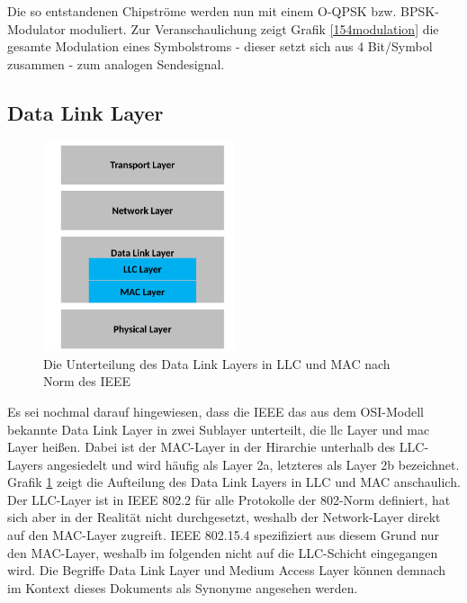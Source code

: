 Die so entstandenen Chipströme werden nun mit einem O-QPSK bzw. BPSK-Modulator moduliert. Zur Veranschaulichung zeigt Grafik \ref{154modulation} die gesamte Modulation eines Symbolstroms - dieser setzt sich aus 4 Bit/Symbol zusammen - zum analogen Sendesignal. \\

\subsection{Data Link Layer}
\begin{figure}
	\centering
	\includegraphics[width=0.5\textwidth]{Grafiken-Alex/ieee-osi.pdf}
	\caption{Die Unterteilung des Data Link Layers in LLC und MAC nach Norm des IEEE}
	\label{ieee-osi}
\end{figure}
Es sei nochmal darauf hingewiesen, dass die IEEE das aus dem OSI-Modell bekannte Data Link Layer in zwei Sublayer unterteilt, die \ac{llc} Layer und \acf{mac} Layer heißen. Dabei ist der MAC-Layer in der Hirarchie unterhalb des LLC-Layers angesiedelt und wird häufig als Layer 2a, letzteres als Layer 2b bezeichnet. Grafik \ref{ieee-osi} zeigt die Aufteilung des Data Link Layers in LLC und MAC anschaulich.\\
Der LLC-Layer ist in IEEE 802.2 für alle Protokolle der 802-Norm definiert, hat sich aber in der Realität nicht durchgesetzt, weshalb der Network-Layer direkt auf den MAC-Layer zugreift. \cite{bartusch}IEEE 802.15.4 spezifiziert aus diesem Grund nur den MAC-Layer, weshalb im folgenden nicht auf die LLC-Schicht eingegangen wird. Die Begriffe Data Link Layer und Medium Access Layer können demnach im Kontext dieses Dokuments als Synonyme angesehen werden.
